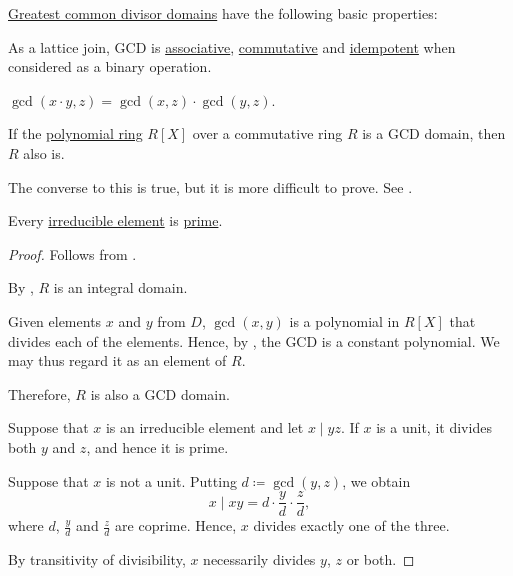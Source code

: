 \begin{proposition}\label{thm:def:gcd_domain}
  \hyperref[def:gcd_domain]{Greatest common divisor domains} have the following basic properties:
  \begin{thmenum}
     As a lattice join, GCD is \hyperref[def:binary_operation/associative]{associative}, \hyperref[def:binary_operation/commutative]{commutative} and \hyperref[def:binary_operation/idempotent]{idempotent} when considered as a binary operation.

     \( \gcd(x \cdot y, z) = \gcd(x, z) \cdot \gcd(y, z) \).

     If the \hyperref[def:polynomial_algebra]{polynomial ring} \( R[X] \) over a commutative ring \( R \) is a GCD domain, then \( R \) also is.

    The converse to this is true, but it is more difficult to prove. See .

     Every \hyperref[def:domain_divisibility/irreducible]{irreducible element} is \hyperref[def:domain_divisibility/prime]{prime}.
  \end{thmenum}
\end{proposition}
\begin{proof}
   Follows from .

   By , \( R \) is an integral domain.

  Given elements \( x \) and \( y \) from \( D \), \( \gcd(x, y) \) is a polynomial in \( R[X] \) that divides each of the elements. Hence, by , the GCD is a constant polynomial. We may thus regard it as an element of \( R \).

  Therefore, \( R \) is also a GCD domain.

   Suppose that \( x \) is an irreducible element and let \( x \mid yz \). If \( x \) is a unit, it divides both \( y \) and \( z \), and hence it is prime.

  Suppose that \( x \) is not a unit. Putting \( d \coloneqq \gcd(y, z) \), we obtain
  \begin{equation*}
    x \mid x y = d \cdot \frac y d \cdot \frac z d,
  \end{equation*}
  where \( d \), \( \tfrac y d \) and \( \tfrac z d \) are coprime. Hence, \( x \) divides exactly one of the three.

  By transitivity of divisibility, \( x \) necessarily divides \( y \), \( z \) or both.
\end{proof}

